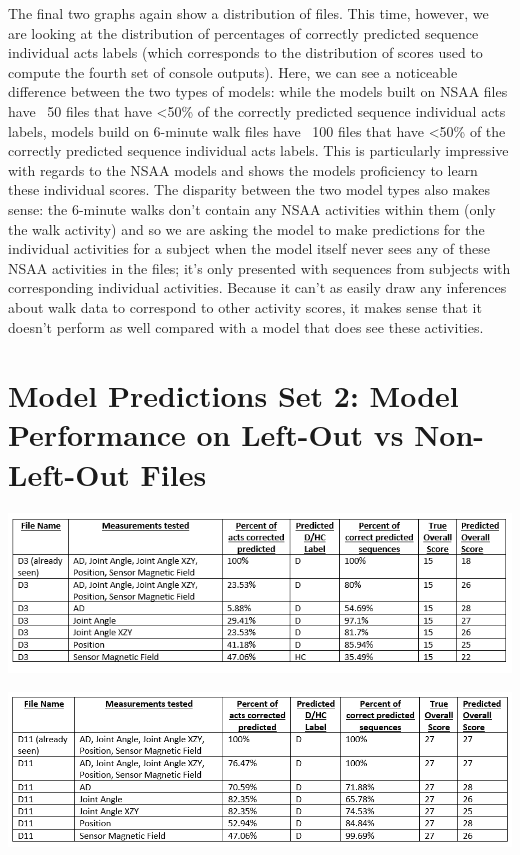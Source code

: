 \documentclass[12pt,twoside]{report}
\begin{document}
\quad The final two graphs again show a distribution of files. This time, however, we are looking at the distribution of percentages of correctly predicted sequence individual acts labels (which corresponds to the distribution of scores used to compute the fourth set of console outputs). Here, we can see a noticeable difference between the two types of models: while the models built on NSAA files have ~50 files that have <50\% of the correctly predicted sequence individual acts labels, models build on 6-minute walk files have ~100 files that have <50\% of the correctly predicted sequence individual acts labels. This is particularly impressive with regards to the NSAA models and shows the models proficiency to learn these individual scores. The disparity between the two model types also makes sense: the 6-minute walks don’t contain any NSAA activities within them (only the walk activity) and so we are asking the model to make predictions for the individual activities for a subject when the model itself never sees any of these NSAA activities in the files; it’s only presented with sequences from subjects with corresponding individual activities. Because it can’t as easily draw any inferences about walk data to correspond to other activity scores, it makes sense that it doesn’t perform as well compared with a model that does see these activities.




\section{Model Predictions Set 2: Model Performance on Left-Out vs Non-Left-Out Files}

\begin{center}
\includegraphics[scale=0.4]{project_figures/fig11_3}
\end{center}

\begin{center}
\includegraphics[scale=0.4]{project_figures/fig11_4}
\end{center}
\end{document}

